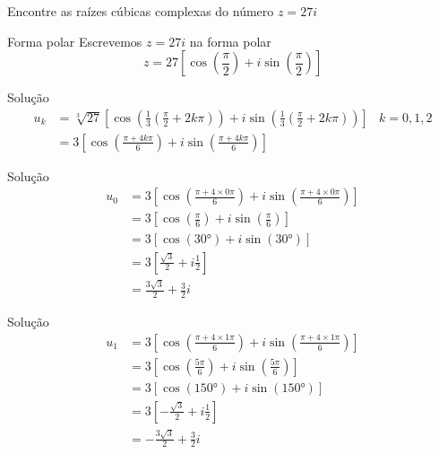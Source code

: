 \begin{question}
  Encontre as raízes cúbicas complexas do número \( z = 27i \)
\end{question}

\begin{resolution}{Forma polar}
  Escrevemos \( z = 27i \) na forma polar
  \[
    z = 27 \left[ \cos\left(\frac{\pi}{2}\right) + i \sin\left(\frac{\pi}{2}\right) \right]
  \]
\end{resolution}

\begin{resolution}{Solução}
\begin{align*}
  u_k
  & = \sqrt[3]{27} \left[
  \cos\left(\frac{1}{3}\left(\frac{\pi}{2} + 2k\pi\right)\right)
  + i \sin\left(\frac{1}{3}\left(\frac{\pi}{2} + 2k\pi\right)\right)
  \right]
  & k = 0, 1, 2    \\
  & = 3 \left[
  \cos\left( \frac{\pi + 4k\pi}{6} \right)
  + i \sin\left( \frac{\pi + 4k\pi}{6} \right)
  \right]
\end{align*}
\end{resolution}

\begin{resolution}{Solução}
\begin{align*}
  u_0
  & = 3 \left[
  \cos\left( \frac{\pi + 4\times0\pi}{6} \right)
  + i \sin\left( \frac{\pi + 4\times0\pi}{6} \right)
  \right] \\
  & = 3 \left[
  \cos\left( \frac{\pi}{6} \right)
  + i \sin\left( \frac{\pi}{6} \right)
  \right] \\
  & = 3 \left[
  \cos\left( \ang{30} \right)
  + i \sin\left( \ang{30} \right)
  \right] \\
  & = 3 \left[
  \frac{\sqrt{3}}{2}
  + i \frac{1}{2}
  \right] \\
  & = \frac{3\sqrt{3}}{2} + \frac{3}{2} i
\end{align*}
\end{resolution}

\begin{resolution}{Solução}
\begin{align*}
  u_1
  & = 3 \left[
  \cos\left( \frac{\pi + 4\times1\pi}{6} \right)
  + i \sin\left( \frac{\pi + 4\times1\pi}{6} \right)
  \right] \\
  & = 3 \left[
  \cos\left( \frac{5\pi}{6} \right)
  + i \sin\left( \frac{5\pi}{6} \right)
  \right] \\
  & = 3 \left[
  \cos\left( \ang{150} \right)
  + i \sin\left( \ang{150} \right)
  \right] \\
  & = 3 \left[
  - \frac{\sqrt{3}}{2}
  + i \frac{1}{2}
  \right] \\
  & = -\frac{3\sqrt{3}}{2} + \frac{3}{2}i
\end{align*}
\end{resolution}

